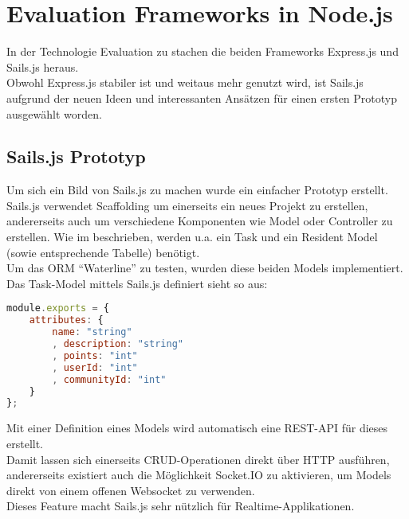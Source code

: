 \section{Evaluation Frameworks in Node.js}
\label{sec:evaluation-frameworks-nodejs}

In der Technologie Evaluation zu  stachen die beiden Frameworks Express.js \cite{Expressjs}
und Sails.js \cite{sails} heraus.\\
Obwohl Express.js stabiler ist und weitaus mehr genutzt wird, ist Sails.js aufgrund der neuen Ideen und interessanten Ansätzen für einen ersten Prototyp ausgewählt worden.

\subsection{Sails.js Prototyp}
Um sich ein Bild von Sails.js zu machen wurde ein einfacher Prototyp \cite{SailsPrototyp} erstellt.\\[0.5mm]

Sails.js verwendet \gls{Scaffolding} um einerseits ein neues Projekt zu erstellen, andererseits auch um verschiedene Komponenten wie Model oder Controller zu erstellen.
Wie im  beschrieben, werden u.a. ein Task und ein Resident Model (sowie entsprechende Tabelle) benötigt.\\
Um das \gls{ORM} ``Waterline'' \cite{Waterline} zu testen, wurden diese beiden Models implementiert.\\
Das Task-Model mittels Sails.js definiert sieht so aus:\\

\begin{lstlisting}[language=JavaScript, caption=Task Model in Sails.js]
module.exports = {
	attributes: {
		name: "string"
		, description: "string"
		, points: "int"
		, userId: "int"
		, communityId: "int"
	}
};
\end{lstlisting}

Mit einer Definition eines Models wird automatisch eine \gls{REST}-API für dieses erstellt.\\
Damit lassen sich einerseits CRUD-Operationen direkt über HTTP ausführen, andererseits existiert auch die Möglichkeit Socket.IO \cite{SocketIO} zu aktivieren, um Models direkt von einem offenen \gls{Websocket} zu verwenden.\\
Dieses Feature macht Sails.js sehr nützlich für \gls{Realtime}-Applikationen.\\[0.5mm]


